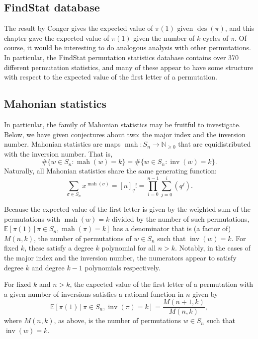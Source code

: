 \subsection{FindStat database}
The result by Conger gives the expected value of $\pi(1)$ given
$\operatorname{des}(\pi)$, and this chapter gave the expected value of
$\pi(1)$ given the number of $k$-cycles of $\pi$. Of course, it would be
interesting to do analogous analysis with other permutations. In particular,
the FindStat permutation statistics database \cite{FindStat} contains over
370 different permutation statistics, and many of these appear to have some
structure with respect to the expected value of the first letter of a
permutation.

\subsection{Mahonian statistics}
In particular, the family of Mahonian statistics may be fruitful to investigate.
Below, we have given conjectures about two: the major index and the inversion number.
Mahonian statistics are maps
$\operatorname{mah} \colon S_n \rightarrow \mathbb{N}_{\geq0}$ that are
equidistributed with the inversion number.\cite{Foata} That is, \[
  \#\{w \in S_n : \operatorname{mah}(w) = k\} =
  \#\{w \in S_n : \operatorname{inv}(w) = k\}.
\]
Naturally, all Mahonian statistics share the same generating function: \[
  \sum_{\sigma \in S_n} x^{\operatorname{mah}(\sigma)}
    = [n]_q!
    = \prod_{i=0}^{n-1}\sum_{j=0}^i(q^j).
\]

Because the expected value of the first letter is given by the weighted sum of
the permutations with $\operatorname{mah}(w) = k$ divided by the number of such
permutations, $\mathbb{E}[\pi(1)\, |\, \pi \in S_n, \operatorname{mah}(\pi) = k]$
has a denominator that is (a factor of) $M(n,k)$, the number of permutations
of $w \in S_n$ such that $\operatorname{inv}(w) = k$. For fixed $k$, these
satisfy a degree $k$ polynomial for all $n > k$. Notably, in the cases of
the major index and the inversion number, the numerators appear to satisfy
degree $k$ and degree $k-1$ polynomials respectively.

\begin{conjecture}
  For fixed $k$ and $n > k$, the expected value of the first letter of a
  permutation with a given number of inversions satisfies a rational function
  in $n$ given by \[
    \mathbb{E}[\pi(1)\, |\, \pi \in S_n, \operatorname{inv}(\pi) = k]
    = \frac{M(n+1,k)}{M(n,k)},
  \] where $M(n,k)$, as above, is the number of permutations $w \in S_n$ such
  that $\operatorname{inv}(w) = k$.
\end{conjecture}

